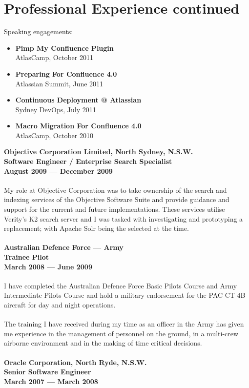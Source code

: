 \documentclass[a4paper]{article}
\begin{document}
\section*{Professional Experience continued}
Speaking engagements:
\begin{itemize}
\item \textbf{Pimp My Confluence Plugin}\\AtlasCamp, October 2011
\item \textbf{Preparing For Confluence 4.0}\\Atlassian Summit, June 2011
\item \textbf{Continuous Deployment @ Atlassian}\\Sydney DevOps, July 2011
\item \textbf{Macro Migration For Confluence 4.0}\\AtlasCamp, October 2010
\end{itemize}
\textbf{Objective Corporation Limited, North Sydney, N.S.W.\\Software Engineer / Enterprise Search Specialist\\August 2009 --- December 2009}\\\\
My role at Objective Corporation was to take ownership of the search and indexing services of the Objective Software Suite and provide guidance and support for the current and future implementations. These services utilise Verity's K2 search server and I was tasked with investigating and prototyping a replacement; with Apache Solr being the selected at the time.\\\\
\textbf{Australian Defence Force --- Army\\Trainee Pilot\\March 2008 --- June 2009}\\\\
I have completed the Australian Defence Force Basic Pilots Course and Army Intermediate Pilots Course and hold a military endorsement for the PAC CT-4B aircraft for day and night operations.\\\\
The training I have received during my time as an officer in the Army has given me experience in the management of personnel on the ground, in a multi-crew airborne environment and in the making of time critical decisions.\\\\
\textbf{Oracle Corporation, North Ryde, N.S.W.\\Senior Software Engineer\\March 2007 --- March 2008}\\\\
\end{document}
